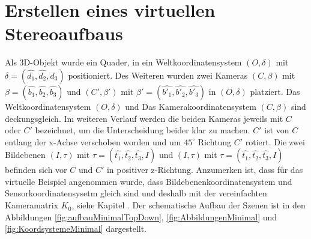 %



\section{Erstellen eines virtuellen Stereoaufbaus}

Als 3D-Objekt wurde ein Quader, in ein Weltkoordinatensystem $(O,\delta)$ mit $\delta = (\hat{d_1},\hat{d_2},\hat{d_3})$ positioniert. Des Weiteren wurden zwei Kameras $(C,\beta)$ mit $\beta = (\hat{b_1},\hat{b_2},\hat{b_3})$ und $(C',\beta')$ mit $\beta' = (\hat{b'_1},\hat{b'_2},\hat{b'_3})$ in $(O,\delta)$ platziert. Das Weltkoordinatensystem $(O,\delta)$ und Das Kamerakoordinatensystem $(C,\beta)$ sind deckungsgleich. Im weiteren Verlauf werden die beiden Kameras jeweils mit $C$ oder $C'$ bezeichnet, um die Unterscheidung beider klar zu machen. $C'$ ist von $C$ entlang der x-Achse verschoben worden und um $45^\circ$ Richtung $C'$ rotiert. Die zwei Bildebenen $(I,\tau)$ mit $\tau = (\hat{t_1},\hat{t_2},\hat{t_3},I)$ und $(I,\tau)$ mit $\tau = (\hat{t_1},\hat{t_2},\hat{t_3},I)$ befinden sich vor $C$ und $C'$ in positiver z-Richtung. 
Anzumerken ist, dass für das virtuelle Beispiel angenommen wurde, dass Bildebenenkoordinatensystem und Sensorkoordinatensysetm gleich sind und deshalb mit der vereinfachten Kameramatrix $K_0$, siehe Kapitel .
Der schematische Aufbau der Szenen ist in den Abbildungen \ref{fig:aufbauMinimalTopDown}, \ref{fig:AbbildungenMinimal} und \ref{fig:KoordsystemeMinimal} dargestellt.



